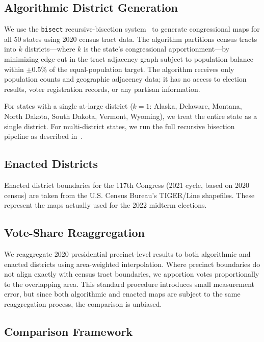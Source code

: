 \label{sec:methodology}

\subsection{Algorithmic District Generation}

We use the \texttt{bisect} recursive-bisection system~\citep{dellaLibera2026recursive}
to generate congressional maps for all 50 states using 2020 census tract data.
The algorithm partitions census tracts into $k$ districts---where $k$ is the
state's congressional apportionment---by minimizing edge-cut in the tract
adjacency graph subject to population balance within $\pm 0.5\%$ of the
equal-population target.  The algorithm receives only population counts and
geographic adjacency data; it has no access to election results, voter
registration records, or any partisan information.

For states with a single at-large district ($k=1$: Alaska, Delaware, Montana,
North Dakota, South Dakota, Vermont, Wyoming), we treat the entire state as a
single district.  For multi-district states, we run the full recursive
bisection pipeline as described in~\citet{dellaLibera2026recursive}.

\subsection{Enacted Districts}

Enacted district boundaries for the 117th Congress (2021 cycle, based on 2020
census) are taken from the U.S. Census Bureau's TIGER/Line shapefiles.  These
represent the maps actually used for the 2022 midterm elections.

\subsection{Vote-Share Reaggregation}

We reaggregate 2020 presidential precinct-level results to both algorithmic
and enacted districts using area-weighted interpolation.  Where precinct
boundaries do not align exactly with census tract boundaries, we apportion
votes proportionally to the overlapping area.  This standard procedure
introduces small measurement error, but since both algorithmic and enacted
maps are subject to the same reaggregation process, the comparison is unbiased.

\subsection{Comparison Framework}


